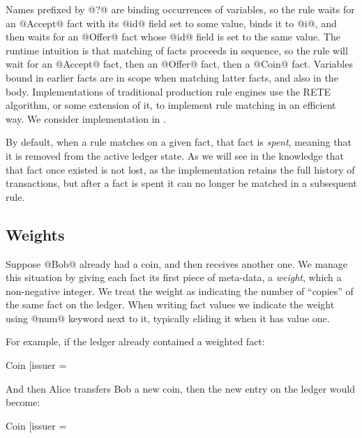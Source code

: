 Names prefixed by @?@ are binding occurrences of variables, so the rule waits for an @Accept@ fact with its @id@ field set to some value, binds it to @i@, and then waits for an @Offer@ fact whose @id@ field is set to the same value. The runtime intuition is that matching of facts proceeds in sequence, so the rule will wait for an @Accept@ fact, then an @Offer@ fact, then a @Coin@ fact. Variables bound in earlier facts are in scope when matching latter facts, and also in the body. Implementations of traditional production rule engines use the RETE~\cite{Forgy1981:RETE} algorithm, or some extension of it, to implement rule matching in an efficient way. We consider implementation in \REF.

By default, when a rule matches on a given fact, that fact is \emph{spent}, meaning that it is removed from the active ledger state. As we will see in \REF the knowledge that that fact once existed is not lost, as the implementation retains the full history of transactions, but after a fact is spent it can no longer be matched in a subsequent rule.


\subsection{Weights}
\label{s:Weights}
Suppose @Bob@ already had a coin, and then receives another one. We manage this situation by giving each fact its first piece of meta-data, a \emph{weight}, which a non-negative integer. We treat the weight as indicating the number of ``copies'' of the same fact on the ledger. When writing fact values we indicate the weight using @num@ keyword next to it, typically eliding it when it has value one.

For example, if the ledger already contained a weighted fact:
\begin{small}
\begin{code}
 Coin [issuer = %
\end{code}
\end{small}
%
And then Alice transfers Bob a new coin, then the new entry on the ledger would become:
\begin{small}
\begin{code}
 Coin [issuer = %
\end{code}
\end{small}
%

